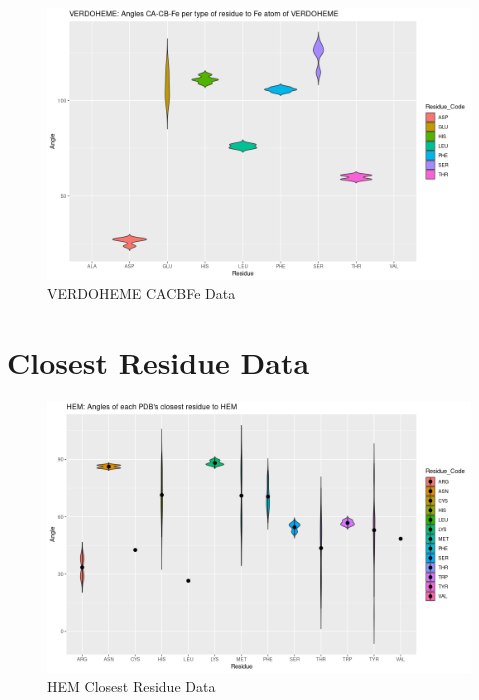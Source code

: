 	\begin{figure}
		\caption{VERDOHEME CACBFe Data}
		\label{figs:VERDOHEME_cab7}
		\includegraphics[width=\linewidth]{7A/VERDOHEME_cab}
	\end{figure}
	
\section{Closest Residue Data}
	\begin{figure}
		\caption{HEM Closest Residue Data}
		\label{figs:HEM_closestRes7}
		\includegraphics[width=\linewidth]{7A/HEM_closestRes}
	\end{figure}
	
